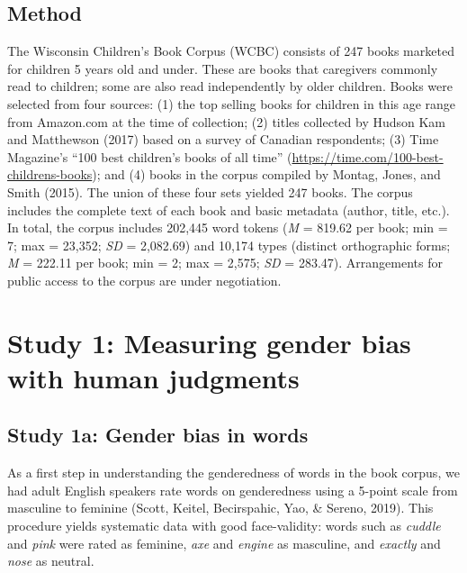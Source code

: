 \documentclass[
  english,
  ,man,floatsintext]{apa6}
\begin{document}
\hypertarget{method}{%
\subsection{Method}\label{method}}

The Wisconsin Children's Book Corpus (WCBC) consists of 247 books marketed for children 5 years old and under. These are books that caregivers commonly read to children; some are also read independently by older children. Books were selected from four sources: (1) the top selling books for children in this age range from Amazon.com at the time of collection; (2) titles collected by Hudson Kam and Matthewson (2017) based on a survey of Canadian respondents; (3) Time Magazine's \enquote{100 best children's books of all time} (\url{https://time.com/100-best-childrens-books}); and (4) books in the corpus compiled by Montag, Jones, and Smith (2015). The union of these four sets yielded 247 books. The corpus includes the complete text of each book and basic metadata (author, title, etc.). In total, the corpus includes 202,445 word tokens (\emph{M} = 819.62 per book; min = 7; max = 23,352; \emph{SD} = 2,082.69) and 10,174 types (distinct orthographic forms; \emph{M} = 222.11 per book; min = 2; max = 2,575; \emph{SD} = 283.47). Arrangements for public access to the corpus are under negotiation.

\hypertarget{study-1-measuring-gender-bias-with-human-judgments}{%
\section{Study 1: Measuring gender bias with human judgments}\label{study-1-measuring-gender-bias-with-human-judgments}}

\hypertarget{study-1a-gender-bias-in-words}{%
\subsection{Study 1a: Gender bias in words}\label{study-1a-gender-bias-in-words}}

As a first step in understanding the genderedness of words in the book corpus, we had adult English speakers rate words on genderedness using a 5-point scale from masculine to feminine (Scott, Keitel, Becirspahic, Yao, \& Sereno, 2019). This procedure yields systematic data with good face-validity: words such as \emph{cuddle} and \emph{pink} were rated as feminine, \emph{axe} and \emph{engine} as masculine, and \emph{exactly} and \emph{nose} as neutral.
\end{document}
